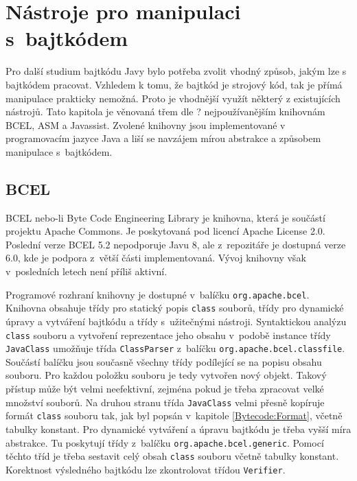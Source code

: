 \chapter{Nástroje pro manipulaci s~bajtkódem}\label{Tools}

Pro další studium bajtkódu Javy bylo potřeba zvolit vhodný způsob, jakým lze s bajtkódem pracovat.
Vzhledem k tomu, že bajtkód je strojový kód, tak je přímá manipulace prakticky nemožná. Proto je vhodnější využít některý z existujících nástrojů. Tato kapitola je věnovaná třem 
dle ? \cite{} 
nejpoužívanějším knihovnám BCEL, ASM a Javassist. Zvolené knihovny jsou implementované v programovacím jazyce Java a liší se navzájem mírou abstrakce a způsobem manipulace s~bajtkódem.


\section{BCEL}\label{Tools:BCEL}


BCEL \cite{BCEL} nebo-li Byte Code Engineering Library je knihovna, která je součástí projektu Apache Commons. Je poskytovaná pod licencí Apache License 2.0. Poslední verze BCEL 5.2 nepodporuje Javu 8, ale z~repozitáře je dostupná verze 6.0, kde je podpora z~větší části implementovaná. Vývoj knihovny však v~posledních letech není příliš aktivní. 

Programové rozhraní knihovny je dostupné v~balíčku \texttt{org.apache.bcel}. Knihovna obsahuje třídy pro statický popis \texttt{class} souborů, třídy pro dynamické úpravy a vytváření bajtkódu a třídy s~užitečnými nástroji. Syntaktickou analýzu \texttt{class} souboru a vytvoření reprezentace jeho obsahu v~podobě instance třídy \texttt{JavaClass} umožňuje třída \texttt{ClassParser} z~balíčku \texttt{org.apache.bcel.classfile}. Součástí balíčku jsou současně všechny třídy podílející se na popisu obsahu souboru. Pro každou položku souboru je tedy vytvořen nový objekt. Takový přístup může být velmi neefektivní, zejména pokud je třeba zpracovat velké množství souborů. Na druhou stranu třída \texttt{JavaClass} velmi přesně kopíruje formát \texttt{class} souboru tak, jak byl popsán v~kapitole \ref{Bytecode:Format}, včetně tabulky konstant.
Pro dynamické vytváření a úpravu bajtkódu je třeba vyšší míra abstrakce. Tu poskytují třídy z~balíčku \texttt{org.apache.bcel.generic}. Pomocí těchto tříd je třeba sestavit celý obsah \texttt{class} souboru včetně tabulky konstant. Korektnost výsledného bajtkódu lze zkontrolovat třídou \texttt{Verifier}.

